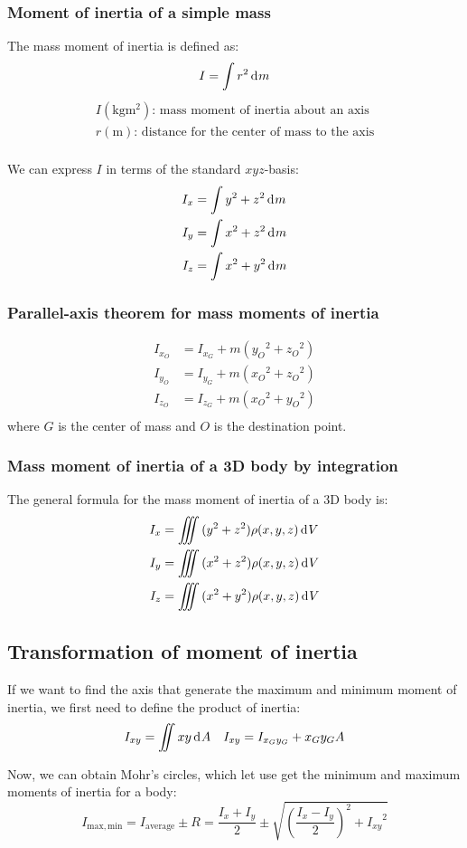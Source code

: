 \documentclass[10pt, twocolumn]{article}
\begin{document}
\subsubsection{Moment of inertia of a simple mass}
The mass moment of inertia is defined as:
\[
  I = \int{r^2 \,\mathrm{d}^{} m}
\]
\[
  \begin{array}{|l}
    I (\si{\kilo\gram\metre\squared}) \text{: mass moment of inertia about an axis} \\
    r (\si{\metre}) \text{: distance for the center of mass to the axis}            \\
  \end{array}
\]

We can express \(I\) in terms of the standard \(xyz\)-basis:
\begin{align*}
  I_x & = \int{y^2 + z^2 \,\mathrm{d}^{} m} \\
  I_y & = \int{x^2 + z^2 \,\mathrm{d}^{} m} \\
  I_z & = \int{x^2 + y^2 \,\mathrm{d}^{} m}
\end{align*}

\subsubsection{Parallel-axis theorem for mass moments of inertia}
\begin{align*}
  I_{x_O} & = I_{x_G} + m({y_O}^2 + {z_O}^2) \\
  I_{y_O} & = I_{y_G} + m({x_O}^2 + {z_O}^2) \\
  I_{z_O} & = I_{z_G} + m({x_O}^2 + {y_O}^2) \\
\end{align*}
where \(G\) is the center of mass and \(O\) is the destination point.


\subsubsection{Mass moment of inertia of a 3D body by integration}
The general formula for the mass moment of inertia of a 3D body is:
\begin{align*}
  I_x & = \iiint{(y^2 + z^2 )\rho(x, y, z) \,\mathrm{d}^{} V} \\
  I_y & = \iiint{(x^2 + z^2 )\rho(x, y, z) \,\mathrm{d}^{} V} \\
  I_z & = \iiint{(x^2 + y^2 )\rho(x, y, z) \,\mathrm{d}^{} V}
\end{align*}

\subsection{Transformation of moment of inertia}
If we want to find the axis that generate the maximum and minimum moment of inertia, we first need to define the product of inertia:
\begin{align*}
  I_{xy} = \iint{xy \,\mathrm{d}^{} A} &  & I_{xy} = I_{x_G y_G} + x_G y_G A
\end{align*}

Now, we can obtain Mohr's circles, which let use get the minimum and maximum moments of inertia for a body:
\[
  I_\mathrm{max, min} = I_\mathrm{average} \pm R = \frac{I_x + I_y}{2} \pm \sqrt{\left( \frac{I_x - I_y}{2} \right)^2 + {I_{xy}}^2}
\]
\end{document}
